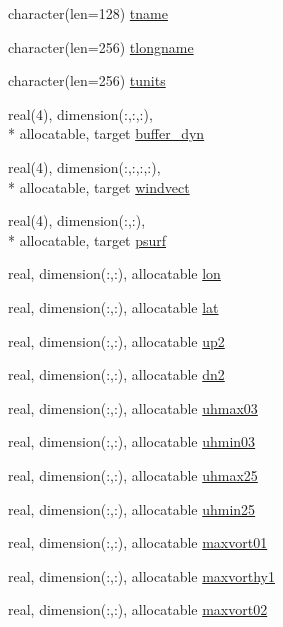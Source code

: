 \begin{DoxyCompactItemize}
\item 
character(len=128) \hyperlink{classfv__nggps__diags__mod_ade8a5d09872d5c2ba95c9a9a81e916fe}{tname}
\item 
character(len=256) \hyperlink{classfv__nggps__diags__mod_a8acfdda0bd8e8b86b400a86615f1b3ef}{tlongname}
\item 
character(len=256) \hyperlink{classfv__nggps__diags__mod_acf58902ead32fad28330b73b5aa61955}{tunits}
\item 
real(4), dimension(\-:,\-:,\-:), \\*
allocatable, target \hyperlink{classfv__nggps__diags__mod_a5e8a9c5b4b5ad6df66de967461a3338b}{buffer\-\_\-dyn}
\item 
real(4), dimension(\-:,\-:,\-:,\-:), \\*
allocatable, target \hyperlink{classfv__nggps__diags__mod_ad92d40cf9570d98ea35bc7da2815dc38}{windvect}
\item 
real(4), dimension(\-:,\-:), \\*
allocatable, target \hyperlink{classfv__nggps__diags__mod_af7f5be1d89289b4cf2b12c6b11fad16a}{psurf}
\item 
real, dimension(\-:,\-:), allocatable \hyperlink{classfv__nggps__diags__mod_aafdb15d16067525ed3d44c2cdde8e417}{lon}
\item 
real, dimension(\-:,\-:), allocatable \hyperlink{classfv__nggps__diags__mod_a134ea86f7c12011dda0297316dc3ea52}{lat}
\item 
real, dimension(\-:,\-:), allocatable \hyperlink{classfv__nggps__diags__mod_aad395c43512c289616cfe7c63927fe51}{up2}
\item 
real, dimension(\-:,\-:), allocatable \hyperlink{classfv__nggps__diags__mod_a6eead80f8c1f8eb3e6d5c5e85856340e}{dn2}
\item 
real, dimension(\-:,\-:), allocatable \hyperlink{classfv__nggps__diags__mod_a672498c2dd7e91c63c8a14544b89313e}{uhmax03}
\item 
real, dimension(\-:,\-:), allocatable \hyperlink{classfv__nggps__diags__mod_aeb25900a2ec78b17f30b044f0dab51fa}{uhmin03}
\item 
real, dimension(\-:,\-:), allocatable \hyperlink{classfv__nggps__diags__mod_ad0c2b22c16b4343ee02a0da7770b1189}{uhmax25}
\item 
real, dimension(\-:,\-:), allocatable \hyperlink{classfv__nggps__diags__mod_a517b0627b47ddc6de2c53f9f13974730}{uhmin25}
\item 
real, dimension(\-:,\-:), allocatable \hyperlink{classfv__nggps__diags__mod_ab16739d4afbb45dc85d35490ace8b500}{maxvort01}
\item 
real, dimension(\-:,\-:), allocatable \hyperlink{classfv__nggps__diags__mod_a8ebec458193f8834ccfe45e2d770e9d7}{maxvorthy1}
\item 
real, dimension(\-:,\-:), allocatable \hyperlink{classfv__nggps__diags__mod_ae3d6e23a909d7ca356786721cebc4c66}{maxvort02}
\end{DoxyCompactItemize}


